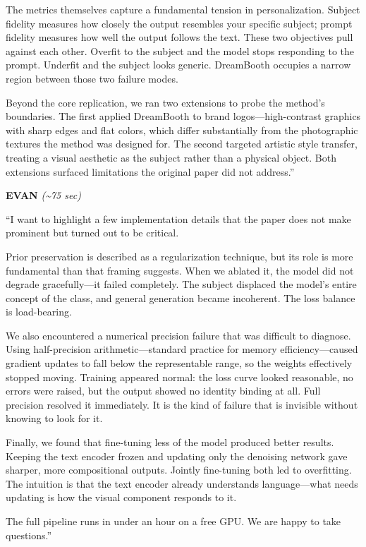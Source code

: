 \documentclass[12pt]{article}
\begin{document}
The metrics themselves capture a fundamental tension in personalization. Subject fidelity measures how closely the output resembles your specific subject; prompt fidelity measures how well the output follows the text. These two objectives pull against each other. Overfit to the subject and the model stops responding to the prompt. Underfit and the subject looks generic. DreamBooth occupies a narrow region between those two failure modes.

Beyond the core replication, we ran two extensions to probe the method's boundaries. The first applied DreamBooth to brand logos---high-contrast graphics with sharp edges and flat colors, which differ substantially from the photographic textures the method was designed for. The second targeted artistic style transfer, treating a visual aesthetic as the subject rather than a physical object. Both extensions surfaced limitations the original paper did not address.''

\textbf{EVAN} \textit{(\textasciitilde{}75 sec)}

``I want to highlight a few implementation details that the paper does not make prominent but turned out to be critical.

Prior preservation is described as a regularization technique, but its role is more fundamental than that framing suggests. When we ablated it, the model did not degrade gracefully---it failed completely. The subject displaced the model's entire concept of the class, and general generation became incoherent. The loss balance is load-bearing.

We also encountered a numerical precision failure that was difficult to diagnose. Using half-precision arithmetic---standard practice for memory efficiency---caused gradient updates to fall below the representable range, so the weights effectively stopped moving. Training appeared normal: the loss curve looked reasonable, no errors were raised, but the output showed no identity binding at all. Full precision resolved it immediately. It is the kind of failure that is invisible without knowing to look for it.

Finally, we found that fine-tuning less of the model produced better results. Keeping the text encoder frozen and updating only the denoising network gave sharper, more compositional outputs. Jointly fine-tuning both led to overfitting. The intuition is that the text encoder already understands language---what needs updating is how the visual component responds to it.

The full pipeline runs in under an hour on a free GPU. We are happy to take questions.''
\end{document}
